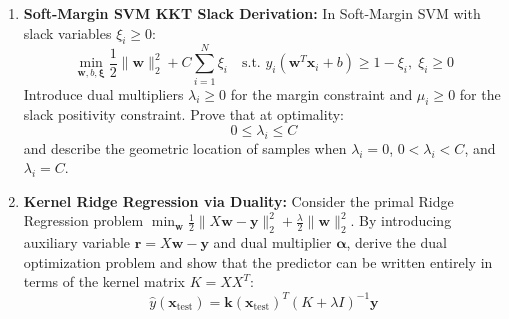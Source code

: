 \begin{enumerate}[label=\textbf{P\arabic*.}]
    \item \textbf{Soft-Margin SVM KKT Slack Derivation:}
    In Soft-Margin SVM with slack variables $\xi_i \ge 0$:
    \begin{equation}
    \min_{\mathbf{w}, b, \boldsymbol{\xi}} \frac{1}{2}\|\mathbf{w}\|_2^2 + C \sum_{i=1}^N \xi_i \quad \text{s.t. } y_i(\mathbf{w}^T \mathbf{x}_i + b) \ge 1 - \xi_i, \; \xi_i \ge 0
    \end{equation}
    Introduce dual multipliers $\lambda_i \ge 0$ for the margin constraint and $\mu_i \ge 0$ for the slack positivity constraint. Prove that at optimality:
    \begin{equation}
    0 \le \lambda_i \le C
    \end{equation}
    and describe the geometric location of samples when $\lambda_i = 0$, $0 < \lambda_i < C$, and $\lambda_i = C$.

    \item \textbf{Kernel Ridge Regression via Duality:}
    Consider the primal Ridge Regression problem $\min_{\mathbf{w}} \frac{1}{2}\|X\mathbf{w} - \mathbf{y}\|_2^2 + \frac{\lambda}{2}\|\mathbf{w}\|_2^2$.
    By introducing auxiliary variable $\mathbf{r} = X\mathbf{w} - \mathbf{y}$ and dual multiplier $\boldsymbol{\alpha}$, derive the dual optimization problem and show that the predictor can be written entirely in terms of the kernel matrix $K = X X^T$:
    \begin{equation}
    \hat{y}(\mathbf{x}_{\text{test}}) = \mathbf{k}(\mathbf{x}_{\text{test}})^T (K + \lambda I)^{-1} \mathbf{y}
    \end{equation}


\end{enumerate}
